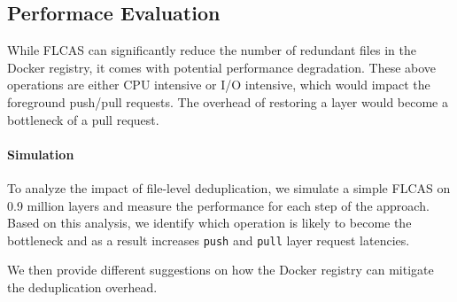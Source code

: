 \subsection{Performace Evaluation}


While FLCAS can significantly reduce the number of redundant files in the
Docker registry, it comes with potential performance degradation.
%
These above
operations are either CPU intensive or I/O intensive, which would impact the
foreground push/pull requests.  The overhead of restoring a layer would become
a bottleneck of a pull request.


\paragraph{Simulation}
%
To analyze the impact of file-level deduplication, we simulate a simple FLCAS on
0.9 million layers and measure the performance for each step of the approach.
%
Based on this analysis, we identify which operation is likely to become the bottleneck
and as a result increases \texttt{push} and \texttt{pull} layer request latencies.

We then provide different suggestions on how the Docker registry can mitigate
the deduplication overhead.





%
%
%


